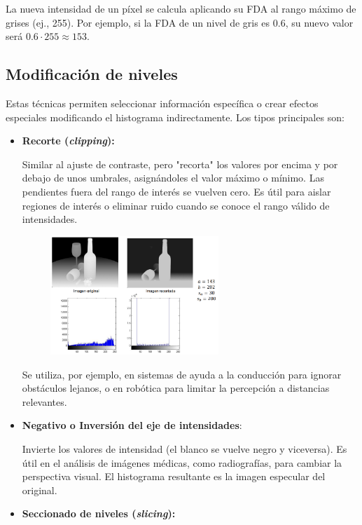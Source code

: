 La nueva intensidad de un píxel se calcula aplicando su FDA al rango máximo de grises (ej., 255). Por ejemplo, si la FDA de un nivel de gris es 0.6, su nuevo valor será $0.6 \cdot 255 \approx 153$.

\subsection{Modificación de niveles}
Estas técnicas permiten seleccionar información específica o crear efectos especiales modificando el histograma indirectamente. Los tipos principales son:
\begin{itemize}
\item \textbf{Recorte (\textit{clipping}):}

Similar al ajuste de contraste, pero "recorta" los valores por encima y por debajo de unos umbrales, asignándoles el valor máximo o mínimo. Las pendientes fuera del rango de interés se vuelven cero. Es útil para aislar regiones de interés o eliminar ruido cuando se conoce el rango válido de intensidades.

\begin{figure}[h]
\centering
\includegraphics[width = 0.6\textwidth]{figs/recorte.png}
\end{figure}

Se utiliza, por ejemplo, en sistemas de ayuda a la conducción para ignorar obstáculos lejanos, o en robótica para limitar la percepción a distancias relevantes.

\item \textbf{Negativo o Inversión del eje de intensidades}:

Invierte los valores de intensidad (el blanco se vuelve negro y viceversa). Es útil en el análisis de imágenes médicas, como radiografías, para cambiar la perspectiva visual. El histograma resultante es la imagen especular del original.

\item \textbf{Seccionado de niveles (\textit{slicing}):}


\end{itemize}
